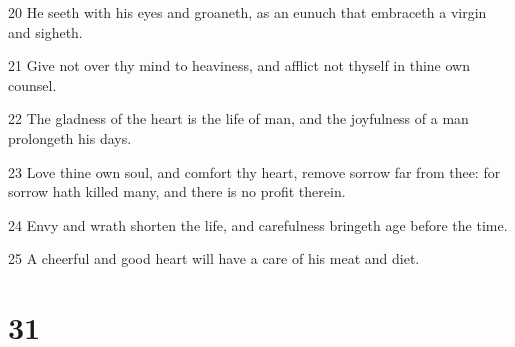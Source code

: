 \par 20 He seeth with his eyes and groaneth, as an eunuch that embraceth a virgin and sigheth.
\par 21 Give not over thy mind to heaviness, and afflict not thyself in thine own counsel.
\par 22 The gladness of the heart is the life of man, and the joyfulness of a man prolongeth his days.
\par 23 Love thine own soul, and comfort thy heart, remove sorrow far from thee: for sorrow hath killed many, and there is no profit therein.
\par 24 Envy and wrath shorten the life, and carefulness bringeth age before the time.
\par 25 A cheerful and good heart will have a care of his meat and diet.

\chapter{31}

